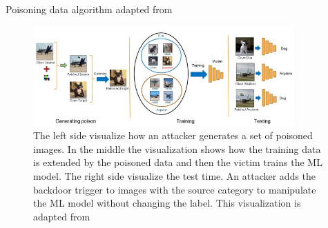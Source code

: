 \begin{algorithm}
  \caption{Poisoning data algorithm adapted from \cite{DBLP:journals/corr/abs-1910-00033}}
  \label{alg:poisoning_hidden}
\end{algorithm}

\begin{figure}[ht!]
  \centering
  \includegraphics[width=10cm]{pictures/procedure_hidden_trigger.jpg}
  \caption{The left side visualize how an attacker generates a set of poisoned images. In the middle the visualization shows how the training data is extended by the poisoned data and then the victim trains the ML model. The right side visualize the test time. An attacker adds the backdoor trigger to images with the source category to manipulate the ML model without changing the label. This visualization is adapted from \cite{DBLP:journals/corr/abs-1910-00033}}
  \label{fig:procedure_hidden_trigger}
\end{figure}

